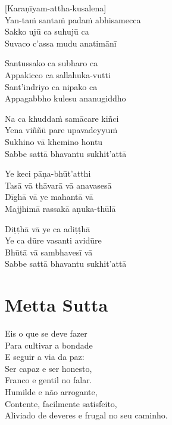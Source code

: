 [Karaṇīyam-attha-kusalena]\\
Yan-taṁ santaṁ padaṁ abhisamecca\\
Sakko ujū ca suhujū ca\\
Suvaco c'assa mudu anatimānī

Santussako ca subharo ca\\
Appakicco ca sallahuka-vutti\\
Sant'indriyo ca nipako ca\\
Appagabbho kulesu ananugiddho

Na ca khuddaṁ samācare kiñci\\
Yena viññū pare upavadeyyuṁ\\
Sukhino vā khemino hontu\\
Sabbe sattā bhavantu sukhit'attā

Ye keci pāṇa-bhūt'atthi\\
Tasā vā thāvarā vā anavasesā\\
Dīghā vā ye mahantā vā\\
Majjhimā rassakā aṇuka-thūlā

Diṭṭhā vā ye ca adiṭṭhā\\
Ye ca dūre vasanti avidūre\\
Bhūtā vā sambhavesī vā\\
Sabbe sattā bhavantu sukhit'attā

\chapter[Metta Sutta]{Metta Sutta}


\begin{leader}
\end{leader}

Eis o que se deve fazer\\
Para cultivar a bondade\\
E seguir a via da paz:\\
Ser capaz e ser honesto,\\
Franco e gentil no falar.\\
Humilde e não arrogante,\\
Contente, facilmente satisfeito,\\
Aliviado de deveres e frugal no seu caminho.

